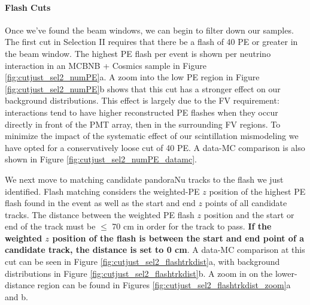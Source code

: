 
\paragraph{Flash Cuts}
Once we've found the beam windows, we can begin to filter down our samples. The first cut in Selection II requires that there be a flash of 40 PE or greater in the beam window. The highest PE flash per event is shown per neutrino interaction in an MCBNB + Cosmics sample in Figure \ref{fig:cutjust_sel2_numPE}a. A zoom into the low PE region in Figure \ref{fig:cutjust_sel2_numPE}b shows that this cut has a stronger effect on our background distributions. This effect is largely due to the FV requirement: interactions tend to have higher reconstructed PE flashes when they occur directly in front of the PMT array, then in the surrounding FV regions. To minimize the impact of the systematic effect of our scintillation mismodeling \cite{bib:kazu_optical_bug} we have opted for a conservatively loose cut of 40 PE. A data-MC comparison is also shown in Figure \ref{fig:cutjust_sel2_numPE_datamc}.
\par We next move to matching candidate pandoraNu tracks to the flash we just identified.  Flash matching considers the weighted-PE $z$ position of the highest PE flash found in the event as well as the start and end $z$ points of all candidate tracks. The distance between the weighted PE flash $z$ position and the start or end of the track must be $\leq$ 70 cm in order for the track to pass. \textbf{If the weighted $z$ position of the flash is between the start and end point of a candidate track, the distance is set to 0 cm}. A data-MC comparison at this cut can be seen in Figure \ref{fig:cutjust_sel2_flashtrkdist}a, with background distributions in Figure \ref{fig:cutjust_sel2_flashtrkdist}b.  A zoom in on the lower-distance region can be found in Figures \ref{fig:cutjust_sel2_flashtrkdist_zoom}a and b. 


